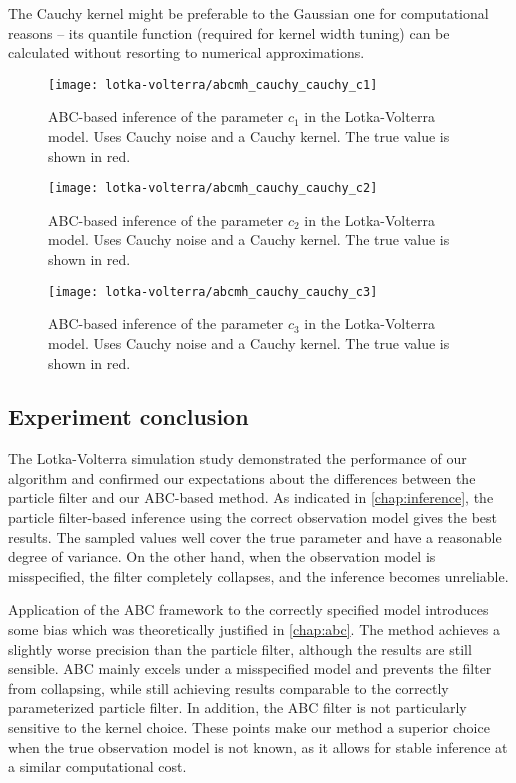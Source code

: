 The Cauchy kernel might be preferable to the Gaussian one for computational reasons -- its quantile function (required for kernel width tuning) can be calculated without resorting to numerical approximations.

\begin{figure}[ht]
    \centering
    \texttt{[image: lotka-volterra/abcmh\_cauchy\_cauchy\_c1]}
    \caption{ABC-based inference of the parameter $c_1$ in the Lotka-Volterra model. Uses Cauchy noise and a Cauchy kernel. The true value is shown in red.}
    \label{fig:lv-abcmh-cauchy-cauchy-c1}
\end{figure}

\begin{figure}[ht]
    \centering
    \texttt{[image: lotka-volterra/abcmh\_cauchy\_cauchy\_c2]}
    \caption{ABC-based inference of the parameter $c_2$ in the Lotka-Volterra model. Uses Cauchy noise and a Cauchy kernel. The true value is shown in red.}
    \label{fig:lv-abcmh-cauchy-cauchy-c2}
\end{figure}

\begin{figure}[ht]
    \centering
    \texttt{[image: lotka-volterra/abcmh\_cauchy\_cauchy\_c3]}
    \caption{ABC-based inference of the parameter $c_3$ in the Lotka-Volterra model. Uses Cauchy noise and a Cauchy kernel. The true value is shown in red.}
    \label{fig:lv-abcmh-cauchy-cauchy-c3}
\end{figure}


\subsection{Experiment conclusion}
The Lotka-Volterra simulation study demonstrated the performance of our algorithm and confirmed our expectations about the differences between the particle filter and our ABC-based method. As indicated in \autoref{chap:inference}, the particle filter-based inference using the correct observation model gives the best results. The sampled values well cover the true parameter and have a reasonable degree of variance. On the other hand, when the observation model is misspecified, the filter completely collapses, and the inference becomes unreliable.

Application of the ABC framework to the correctly specified model introduces some bias which was theoretically justified in \autoref{chap:abc}. The method achieves a slightly worse precision than the particle filter, although the results are still sensible. ABC mainly excels under a misspecified model and prevents the filter from collapsing, while still achieving results comparable to the correctly parameterized particle filter. In addition, the ABC filter is not particularly sensitive to the kernel choice. These points make our method a superior choice when the true observation model is not known, as it allows for stable inference at a similar computational cost.



